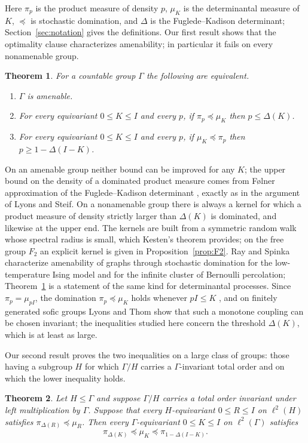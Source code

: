 \documentclass[11pt]{amsart}
\newtheorem{theorem}{Theorem}
\theoremstyle{remark}
\theoremstyle{definition}
\newcommand{\Ga}{\Gamma}
\newcommand{\FK}{\Delta}
\newcommand{\dom}{\preccurlyeq}
\newcommand{\ltwo}{\ell^2}
\begin{document}
Here $\pi_p$ is the product measure of density $p$, $\mu_K$ is the determinantal measure of $K$, $\dom$ is
stochastic domination, and $\FK$ is the Fuglede--Kadison determinant; Section~\ref{sec:notation} gives the
definitions. Our first result shows that the optimality clause characterizes amenability; in particular it fails on
every nonamenable group.

\begin{theorem}\label{thm:A}
For a countable group $\Ga$ the following are equivalent.
\begin{enumerate}
\item $\Ga$ is amenable.
\item For every equivariant $0\le K\le I$ and every $p$, if $\pi_p\dom\mu_K$ then $p\le\FK(K)$.
\item For every equivariant $0\le K\le I$ and every $p$, if $\mu_K\dom\pi_p$ then $p\ge 1-\FK(I-K)$.
\end{enumerate}
\end{theorem}

On an amenable group
neither bound can be improved for any $K$; the upper bound on the density of a dominated product measure comes from
F{\o}lner approximation of the Fuglede--Kadison determinant \cite{LT14}, exactly as in the argument of Lyons and Steif.
On a nonamenable group there is always a kernel for which a product measure of density strictly larger than $\FK(K)$ is
dominated, and likewise at the upper end. The kernels are built from a symmetric random walk whose spectral radius is
small, which Kesten's theorem \cite{Kes59} provides; on the free group $F_2$ an explicit kernel is given in
Proposition~\ref{prop:F2}. Ray and Spinka \cite{RS} characterize amenability of graphs through stochastic domination
for the low-temperature Ising model and for the infinite cluster of Bernoulli percolation; Theorem~\ref{thm:A} is a
statement of the same kind for determinantal processes. Since $\pi_p=\mu_{pI}$, the domination $\pi_p\dom\mu_K$ holds
whenever $pI\le K$ \cite[Thm.~2.9]{LyICM}, and on finitely generated sofic groups Lyons and Thom \cite{LyT16} show
that such a monotone coupling can be chosen invariant; the inequalities studied here concern the threshold $\FK(K)$,
which is at least as large.

Our second result proves the two inequalities on a large class of groups: those having a subgroup $H$ for which
$\Ga/H$ carries a $\Ga$-invariant total order and on which the lower inequality holds.

\begin{theorem}\label{thm:B}
Let $H\le\Ga$ and suppose $\Ga/H$ carries a total order invariant under left multiplication by $\Ga$. Suppose that
every $H$-equivariant $0\le R\le I$ on $\ltwo(H)$ satisfies $\pi_{\FK(R)}\dom\mu_R$. Then every $\Ga$-equivariant
$0\le K\le I$ on $\ltwo(\Ga)$ satisfies
\[
\pi_{\FK(K)}\dom\mu_K\dom\pi_{1-\FK(I-K)}.
\]
\end{theorem}
\end{document}
